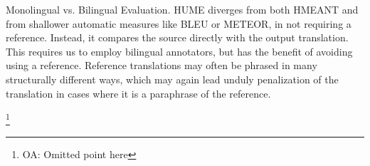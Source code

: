 \documentclass[11pt,letterpaper]{article}
\makeatletter
\renewcommand{\paragraph}{
  \@startsection{paragraph}{4}
  {\z@}{.1ex \@plus .1ex \@minus .1ex}{-1.5em}
  {\normalfont\normalsize\bfseries}
}
\newcommand{\com}[1]{}
\newcommand{\oa}[1]{\footnote{\color{red}OA: #1}}
\newcommand{\bh}[1]{\footnote{\color{blue}BH: #1}}
\makeatother
\begin{document}



\paragraph{Monolingual vs. Bilingual Evaluation.}
\label{src-vs-ref}
HUME diverges from both HMEANT and from shallower automatic measures
like BLEU or METEOR, in not requiring a reference.
Instead, it compares the source directly with the output translation.
This requires us to employ bilingual annotators, but has the benefit of avoiding
using a reference. Reference translations may often be phrased in many structurally different
ways, which may again lead unduly penalization of the translation in cases where
it is a paraphrase of the reference.




\com{
\paragraph{Error Localisation.}
In HMEANT, an error in a child node often results in the parent node
being penalised as well. This makes it harder to quantify the true scale of  
the original error, as its effect gets propagated up the tree. 
In HUME, errors are localised as much as possible to where they occur,
by the separation of atomic and structural units,
which supports a more accurate aggregation of the translation errors
to a composite score.
}
\oa{Omitted point here}

\end{document}
